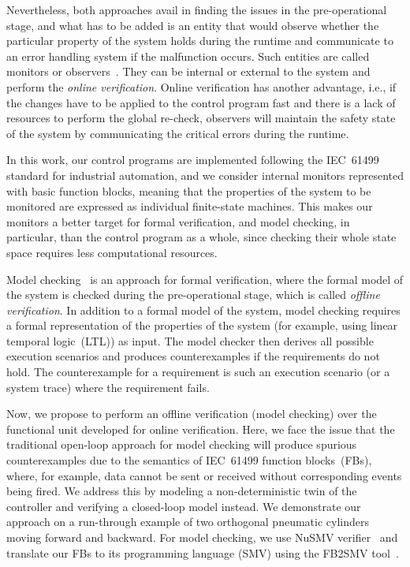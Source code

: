 \begin{bibunit}
Nevertheless, both approaches avail in finding the issues in the pre-operational stage, and what has to be added is an entity that would observe whether the particular property of the system holds during the runtime and communicate to an error handling system if the malfunction occurs. Such entities are called monitors or observers~\cite{17jhunjhunwala2022monitoring}. They can be internal or external to the system and perform the \emph{online verification}. Online verification has another advantage, i.e., if the changes have to be applied to the control program fast and there is a lack of resources to perform the global re-check, observers will maintain the safety state of the system by communicating the critical errors during the runtime.

In this work, our control programs are implemented following the IEC~61499 standard for industrial automation, and we consider internal monitors represented with basic function blocks, meaning that the properties of the system to be monitored are expressed as individual finite-state machines. This makes our monitors a better target for formal verification, and model checking, in particular, than the control program as a whole, since checking their whole state space requires less computational resources.

Model checking~\cite{clarke1999} is an approach for formal verification, where the formal model of the system is checked during the pre-operational stage, which is called \emph{offline verification}. In addition to a formal model of the system, model checking requires a formal representation of the properties of the system (for example, using linear temporal logic~(LTL)) as input. The model checker then derives all possible execution scenarios and produces counterexamples if the requirements do not hold. The counterexample for a requirement is such an execution scenario (or a system trace) where the requirement fails. 

Now, we propose to perform an offline verification (model checking) over the functional unit developed for online verification. Here, we face the issue that the traditional open-loop approach for model checking will produce spurious counterexamples due to the semantics of IEC~61499 function blocks~(FBs), where, for example, data cannot be sent or received without corresponding events being fired. 
We address this by modeling a non-deterministic twin of the controller and verifying a closed-loop model instead. We demonstrate our approach on a run-through example of two orthogonal pneumatic cylinders moving forward and backward. For model checking, we use NuSMV verifier~\cite{nusmv} and translate our FBs to its programming language (SMV) using the FB2SMV tool~\cite{drozdov2015fb2smv}.


\end{bibunit}
